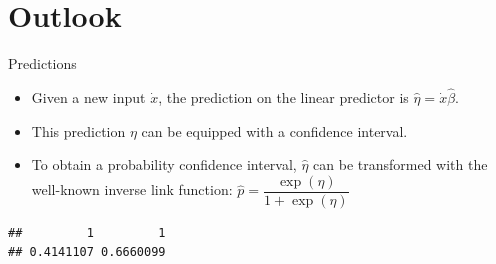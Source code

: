 \documentclass[
  ignorenonframetext,
]{beamer}
\newenvironment{Shaded}{\begin{snugshade}}{\end{snugshade}}
\newcommand{\DataTypeTok}[1]{\textcolor[rgb]{0.13,0.29,0.53}{#1}}
\newcommand{\DecValTok}[1]{\textcolor[rgb]{0.00,0.00,0.81}{#1}}
\newcommand{\FloatTok}[1]{\textcolor[rgb]{0.00,0.00,0.81}{#1}}
\newcommand{\KeywordTok}[1]{\textcolor[rgb]{0.13,0.29,0.53}{\textbf{#1}}}
\newcommand{\NormalTok}[1]{#1}
\newcommand{\OperatorTok}[1]{\textcolor[rgb]{0.81,0.36,0.00}{\textbf{#1}}}
\newcommand{\StringTok}[1]{\textcolor[rgb]{0.31,0.60,0.02}{#1}}
\providecommand{\tightlist}{%
  \setlength{\itemsep}{0pt}\setlength{\parskip}{0pt}}
\begin{document}
\hypertarget{outlook}{%
\section{Outlook}\label{outlook}}

\begin{frame}[fragile]{Predictions}
\protect\hypertarget{predictions}{}

\begin{itemize}
\tightlist
\item
  Given a new input \(\dot{x}\), the prediction on the linear predictor
  is \(\hat{\eta}=\dot{x}\hat{\beta}\).
\item
  This prediction \(\eta\) can be equipped with a confidence interval.
\item
  To obtain a probability confidence interval, \(\hat{\eta}\) can be
  transformed with the well-known inverse link function:
  \(\hat{p}=\dfrac{\exp(\eta)}{1+\exp(\eta)}\)
\end{itemize}

\tiny

\begin{Shaded}
\end{Shaded}

\begin{verbatim}
##         1         1 
## 0.4141107 0.6660099
\end{verbatim}

\normalsize

\end{frame}
\end{document}
